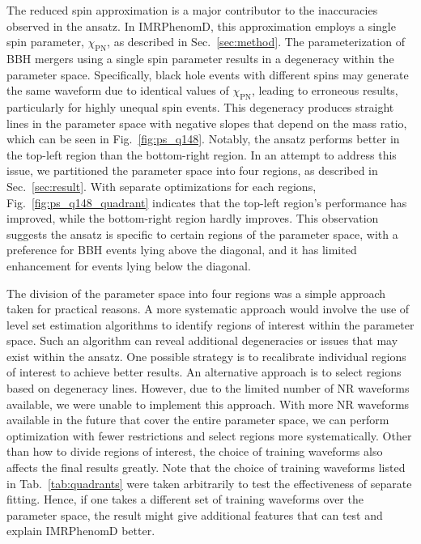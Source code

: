 \documentclass[twocolumn]{aastex631}
\begin{document}
The reduced spin approximation is a major contributor to the inaccuracies
observed in the ansatz. In IMRPhenomD, this approximation employs a single spin
parameter, $\chi_{\mathrm{PN}}$, as described in Sec.~\ref{sec:method}. The
parameterization of BBH mergers using a single spin parameter results in a
degeneracy within the parameter space. Specifically, black hole events with
different spins may generate the same waveform due to identical values of
$\chi_{\mathrm{PN}}$, leading to erroneous results, particularly for highly
unequal spin events. This degeneracy produces straight lines in the parameter
space with negative slopes that depend on the mass ratio, which can be seen in 
Fig.~\ref{fig:ps_q148}. Notably, the ansatz performs better in the top-left
region than the bottom-right region. In an attempt to address
this issue, we partitioned the parameter space into four regions, as described
in Sec.~\ref{sec:result}. With separate optimizations for each
regions, Fig.~\ref{fig:ps_q148_quadrant} indicates that the top-left region's 
performance has improved, while the bottom-right region hardly improves. 
This observation suggests the ansatz is specific to certain regions of the 
parameter space, with a preference for BBH events lying above the diagonal, 
and it has limited enhancement for events lying below the diagonal. 

The division of the parameter space into four regions was a simple approach
taken for practical reasons. A more systematic approach would involve the use of
level set estimation algorithms to identify regions of interest within the
parameter space. Such an algorithm can reveal additional degeneracies or issues
that may exist within the ansatz. One possible strategy is to recalibrate
individual regions of interest to achieve better results. An alternative
approach is to select regions based on degeneracy lines. However, due to the
limited number of NR waveforms available, we were unable to implement this
approach. With more NR waveforms available in the future that cover the entire
parameter space, we can perform optimization with fewer restrictions and select
regions more systematically. Other than how to divide regions of interest, the 
choice of training waveforms also affects the final results greatly. Note that 
the choice of training waveforms listed in Tab.~\ref{tab:quadrants} were taken 
arbitrarily to test the effectiveness of separate fitting. Hence, if one takes 
a different set of training waveforms over the parameter space, the result might 
give additional features that can test and explain IMRPhenomD better. 
\end{document}
